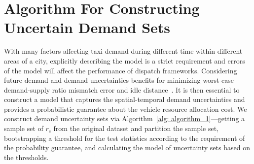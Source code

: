 \documentclass[10pt,twocolumn,twoside,english]{IEEEtran}
\begin{document}
\section{Algorithm For Constructing Uncertain Demand Sets}
\label{sec:algorithm1}
With many factors affecting taxi demand during different time within different areas of a city, explicitly describing the model is a strict requirement and errors of the model will affect the performance of dispatch frameworks. Considering future demand and demand uncertainties benefits for minimizing worst-case demand-supply ratio mismatch error and idle distance~\cite{taxi_Feiiccps15, Miao_tase16}. It is then essential to construct a model that captures the spatial-temporal demand uncertainties and provides a probabilistic guarantee about the vehicle resource allocation cost. We construct demand uncertainty sets via Algorithm~\ref{alg: algorithm_1}---getting a sample set of $r_c$ from the original dataset and partition the sample set, bootstrapping a threshold for the test statistics according to the requirement of the probability guarantee, and calculating the model of uncertainty sets based on the thresholds. 
\end{document}

